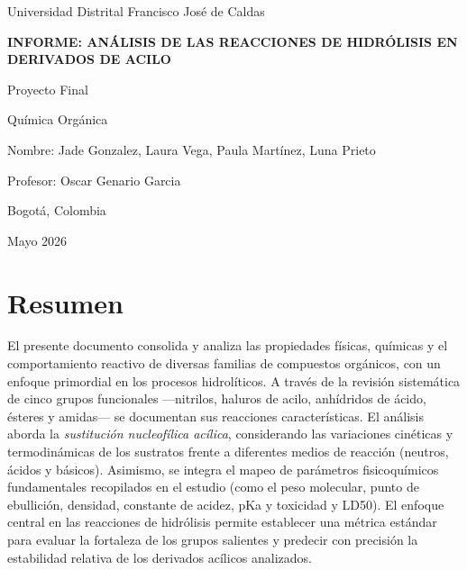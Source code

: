 \documentclass{article}
\begin{document}
\begin{titlepage}
    \centering
    
    {\Large Universidad Distrital Francisco José de Caldas \par}
    \vspace{1.5cm}
    
    {\Huge \textbf{INFORME: ANÁLISIS DE LAS REACCIONES DE HIDRÓLISIS EN DERIVADOS DE ACILO} \par}
    \vspace{1cm}
    
    {\Large Proyecto Final \par}
    \vspace{3cm}
    
    {\Large Química Orgánica \par}
    \vspace{3cm}
    
    {\large 
    Nombre: Jade Gonzalez, Laura Vega, Paula Martínez, Luna Prieto \par
    Profesor: Oscar Genario Garcia \par
    }
    
    \vfill
    
    {\large Bogotá, Colombia \par}
    {\large Mayo 2026 \par}

\end{titlepage}

\section{Resumen}
El presente documento consolida y analiza las propiedades físicas, químicas y el comportamiento reactivo de diversas familias de compuestos orgánicos, con un enfoque primordial en los procesos hidrolíticos. A través de la revisión sistemática de cinco grupos funcionales ---nitrilos, haluros de acilo, anhídridos de ácido, ésteres y amidas--- se documentan sus reacciones características. El análisis aborda la \textit{sustitución nucleofílica acílica}, considerando las variaciones cinéticas y termodinámicas de los sustratos frente a diferentes medios de reacción (neutros, ácidos y básicos). Asimismo, se integra el mapeo de parámetros fisicoquímicos fundamentales recopilados en el estudio (como el peso molecular, punto de ebullición, densidad, constante de acidez, pKa y toxicidad y LD50). El enfoque central en las reacciones de hidrólisis permite establecer una métrica estándar para evaluar la fortaleza de los grupos salientes y predecir con precisión la estabilidad relativa de los derivados acílicos analizados.
\end{document}
